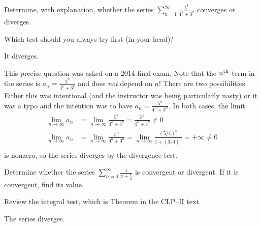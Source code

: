 
\begin{question}[2014D]
Determine, with explanation, whether the series
$\displaystyle \sum_{n=1}^\infty \frac{5^k}{4^k+3^k}$ converges
or diverges.
\end{question}

\begin{hint}
Which test should you always try first (in your head)?
\end{hint}

\begin{answer}
It diverges.
\end{answer}

\begin{solution}
This precise question was asked on a 2014 final exam. Note that the
$n^{\rm th}$ term in the series is $a_n=\frac{5^k}{4^k+3^k}$ and does
\emph{not} depend on $n$! There are two possibilities. Either this was
intentional (and the instructor was being particularly nasty) or it was a
typo and the intention was to have $a_n=\frac{5^n}{4^n+3^n}$. In both cases,
the limit
\begin{align*}
\lim_{n\to\infty} a_n
&=\lim_{n\to\infty} \frac{5^k}{4^k+3^k}
 = \frac{5^k}{4^k+3^k}
 \neq 0 \\
\lim_{n\to\infty} a_n
&=\lim_{n\to\infty} \frac{5^n}{4^n+3^n}
=\lim_{n\to\infty} \frac{(5/4)^n}{1+(3/4)^n}
 = +\infty
 \neq 0 \\
\end{align*}
is nonzero,  so the series diverges by the divergence test.
\end{solution}

\begin{Mquestion}[2016Q5]
Determine whether the series
$\displaystyle\sum_{n=0}^\infty\frac{1}{n+\frac{1}{2}}$
is convergent or divergent. If it is convergent, find its value.
\end{Mquestion}

\begin{hint}
Review the integral test, which is
Theorem  in the CLP--II text.
\end{hint}

\begin{answer}
The series diverges.
\end{answer}

